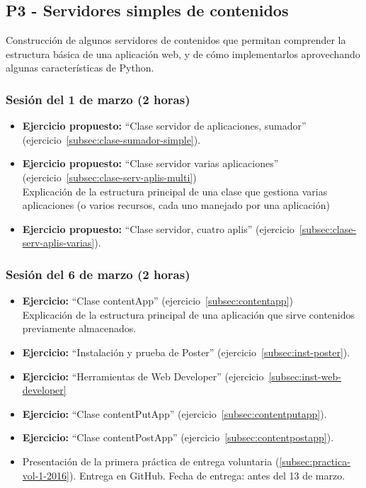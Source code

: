 \documentclass[a4paper,12pt]{article}
\begin{document}
\subsection{P3 - Servidores simples de contenidos}

Construcción de algunos servidores de contenidos que permitan comprender la estructura básica de una aplicación web, y de cómo implementarlos aprovechando algunas características de Python.

\subsubsection{Sesión del 1 de marzo (2 horas)}

\begin{itemize}

\item \textbf{Ejercicio propuesto:} ``Clase servidor de aplicaciones, sumador'' (ejercicio~\ref{subsec:clase-sumador-simple}). 
\item \textbf{Ejercicio propuesto:}  ``Clase servidor varias aplicaciones'' (ejercicio~\ref{subsec:clase-serv-aplis-multi}) \\
  Explicación de la estructura principal de una clase que gestiona varias aplicaciones (o varios recursos, cada uno manejado por una aplicación)
\item \textbf{Ejercicio propuesto:} ``Clase servidor, cuatro aplis'' (ejercicio~\ref{subsec:clase-serv-aplis-varias}).
\end{itemize}

\subsubsection{Sesión del 6 de marzo (2 horas)}


\begin{itemize}

 \item \textbf{Ejercicio:}  ``Clase contentApp'' (ejercicio~\ref{subsec:contentapp}) \\
   Explicación de la estructura principal de una aplicación que sirve contenidos previamente almacenados.
 \item \textbf{Ejercicio:} ``Instalación y prueba de Poster'' (ejercicio~\ref{subsec:inst-poster}).
  \item \textbf{Ejercicio:} ``Herramientas de Web Developer'' (ejercicio~\ref{subsec:inst-web-developer}
 \item \textbf{Ejercicio:} ``Clase contentPutApp'' (ejercicio~\ref{subsec:contentputapp}).
 \item \textbf{Ejercicio:} ``Clase contentPostApp'' (ejercicio~\ref{subsec:contentpostapp}).
  \item Presentación de la primera práctica de entrega voluntaria (\ref{subsec:practica-vol-1-2016}). Entrega en GitHub. Fecha de entrega: antes del 13 de marzo.
\end{itemize}
\end{document}
